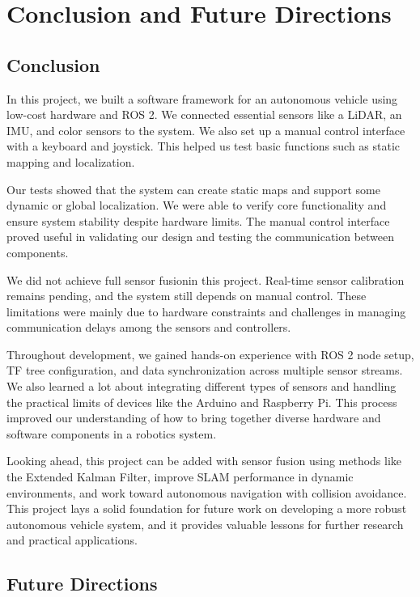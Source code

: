 \documentclass[english,project]{buwthesis}
\begin{document}
\chapter{Conclusion and Future Directions}
\section*{Conclusion}
In this project, we built a software framework for an autonomous vehicle using low-cost hardware and ROS 2. We connected essential sensors like a LiDAR, an IMU, and color sensors to the system. We also set up a manual control interface with a keyboard and joystick. This helped us test basic functions such as static mapping and localization.

Our tests showed that the system can create static maps and support some dynamic or global localization. We were able to verify core functionality and ensure system stability despite hardware limits. The manual control interface proved useful in validating our design and testing the communication between components.

We did not achieve full sensor fusionin this project. Real-time sensor calibration remains pending, and the system still depends on manual control. These limitations were mainly due to hardware constraints and challenges in managing communication delays among the sensors and controllers.

Throughout development, we gained hands-on experience with ROS 2 node setup, TF tree configuration, and data synchronization across multiple sensor streams. We also learned a lot about integrating different types of sensors and handling the practical limits of devices like the Arduino and Raspberry Pi. This process improved our understanding of how to bring together diverse hardware and software components in a robotics system.

Looking ahead, this project can be added with sensor fusion using methods like the Extended Kalman Filter, improve SLAM performance in dynamic environments, and work toward autonomous navigation with collision avoidance. This project lays a solid foundation for future work on developing a more robust autonomous vehicle system, and it provides valuable lessons for further research and practical applications.


\section*{Future Directions}
\end{document}
